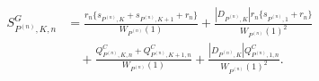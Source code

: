 \[
 \begin{aligned}
 S^G_{P^{(n)},K,n}
 &=\frac{r_n\{s_{P^{(n)},K}+s_{P^{(n)},K+1}+r_n\}}{W_{P^{(n)}}(1)}
 +\frac{|D_{P^{(n)},K}|r_n\{s_{P^{(n)},1}+r_n\}}{W_{P^{(n)}}(1)^2}\\
 &\quad+\frac{Q^C_{P^{(n)},K,n}+Q^C_{P^{(n)},K+1,n}}{W_{P^{(n)}}(1)}
 +\frac{|D_{P^{(n)},K}|Q^C_{P^{(n)},1,n}}{W_{P^{(n)}}(1)^2}.
 \end{aligned}
\]